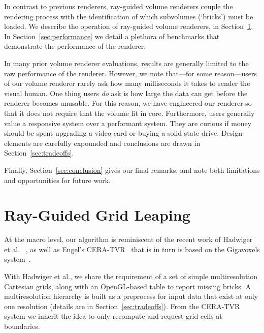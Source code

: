 
In contrast to previous renderers, ray-guided volume renderers couple
the rendering process with the identification of which subvolumes
(`bricks') must be loaded.  We describe the operation of ray-guided
volume renderers, in Section~\ref{sec:algorithm}.
In Section~\ref{sec:performance} we detail a plethora of benchmarks
that demonstrate the performance of the renderer.

In many prior volume renderer evaluations, results are generally
limited to the raw performance of the renderer.  However, we note
that---for some reason---users of our volume renderer rarely ask how
many milliseconds it takes
to render the visual human.  One thing users \emph{do} ask is how large
the data can get before the renderer becomes unusable. For this reason,
we have engineered our renderer so that it does not require that the
volume fit in core.  Furthermore, users generally value a responsive
system over a performant system.  They are curious if money should be
spent upgrading a video card or buying a solid state drive.  Design
elements are carefully expounded and conclusions are drawn in
Section~\ref{sec:tradeoffs}.

Finally, Section~\ref{sec:conclusion} gives our final remarks, and note
both limitations and opportunities for future work.

\section{Ray-Guided Grid Leaping}
\label{sec:algorithm}

At the macro level, our algorithm is reminiscent of the recent work of
Hadwiger et
al. ~\cite{Hadwiger:2012:Guided}, as well as Engel's
CERA-TVR~\cite{Engel:2012:CERA} that is in turn is based on the
Gigavoxels
system~\cite{Crassin:2009:Gigavoxels}.

With Hadwiger et al., we share the requirement of a set of simple
multiresolution Cartesian grids, along with an OpenGL-based table
to report missing bricks.  A multiresolution hierarchy is built as a
preprocess for input data that exist at only one resolution (details
are in Section~\ref{sec:tradeoffs}).  From the CERA-TVR system
we inherit the idea to only recompute and request grid cells at
boundaries.

